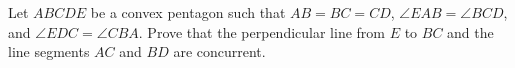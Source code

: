Let $ABCDE$ be a convex pentagon such that $AB = BC = CD$, $\angle EAB = \angle BCD$, and $\angle EDC = \angle CBA$. Prove that the perpendicular line from $E$ to $BC$ and the line segments $AC$ and $BD$ are concurrent.
